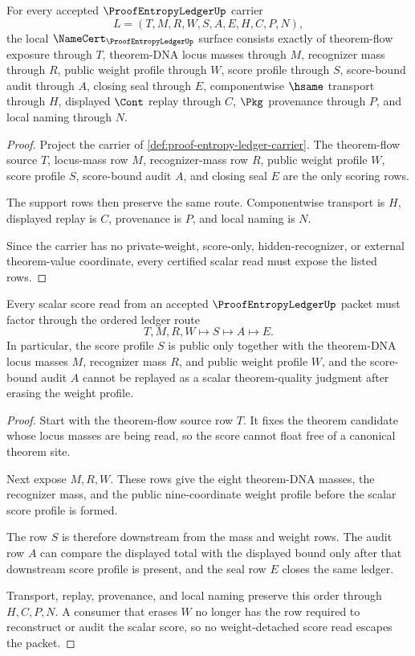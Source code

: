\begin{theorem}
\label{thm:proof-entropy-ledger-namecert-obligations}
For every accepted $\ProofEntropyLedgerUp$ carrier
$$
L=(T,M,R,W,S,A,E,H,C,P,N),
$$
the local $\NameCert_{\ProofEntropyLedgerUp}$ surface consists exactly of theorem-flow exposure through $T$, theorem-DNA locus masses through $M$, recognizer mass through $R$, public weight profile through $W$, score profile through $S$, score-bound audit through $A$, closing seal through $E$, componentwise $\hsame$ transport through $H$, displayed $\Cont$ replay through $C$, $\Pkg$ provenance through $P$, and local naming through $N$.
\end{theorem}
\begin{proof}
Project the carrier of \autoref{def:proof-entropy-ledger-carrier}. The theorem-flow source $T$, locus-mass row $M$, recognizer-mass row $R$, public weight profile $W$, score profile $S$, score-bound audit $A$, and closing seal $E$ are the only scoring rows.

The support rows then preserve the same route. Componentwise transport is $H$, displayed replay is $C$, provenance is $P$, and local naming is $N$.

Since the carrier has no private-weight, score-only, hidden-recognizer, or external theorem-value coordinate, every certified scalar read must expose the listed rows.
\end{proof}

\begin{theorem}
\label{thm:proof-entropy-ledger-weight-profile-nonescape}
Every scalar score read from an accepted $\ProofEntropyLedgerUp$ packet must factor through the ordered ledger route
$$
T,M,R,W \longmapsto S \longmapsto A \longmapsto E .
$$
In particular, the score profile $S$ is public only together with the theorem-DNA locus masses $M$, recognizer mass $R$, and public weight profile $W$, and the score-bound audit $A$ cannot be replayed as a scalar theorem-quality judgment after erasing the weight profile.
\end{theorem}
\begin{proof}
Start with the theorem-flow source row $T$. It fixes the theorem candidate whose locus masses are being read, so the score cannot float free of a canonical theorem site.

Next expose $M,R,W$. These rows give the eight theorem-DNA masses, the recognizer mass, and the public nine-coordinate weight profile before the scalar score profile is formed.

The row $S$ is therefore downstream from the mass and weight rows. The audit row $A$ can compare the displayed total with the displayed bound only after that downstream score profile is present, and the seal row $E$ closes the same ledger.

Transport, replay, provenance, and local naming preserve this order through $H,C,P,N$. A consumer that erases $W$ no longer has the row required to reconstruct or audit the scalar score, so no weight-detached score read escapes the packet.
\end{proof}

